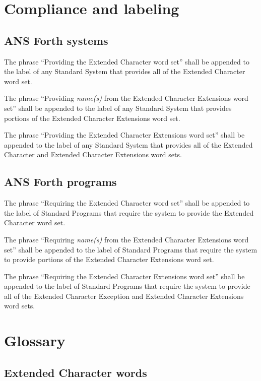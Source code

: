 \section{Compliance and labeling} %

\subsection{ANS Forth systems} %

The phrase ``Providing the Extended Character word set'' shall be
appended to the label of any Standard System that provides all of
the Extended Character word set.

The phrase ``Providing \emph{name(s)} from the Extended Character
Extensions word set'' shall be appended to the label of any Standard
System that provides portions of the Extended Character Extensions
word set.

The phrase ``Providing the Extended Character Extensions word set''
shall be appended to the label of any Standard System that provides
all of the Extended Character and Extended Character Extensions
word sets.

\subsection{ANS Forth programs} %

The phrase ``Requiring the Extended Character word set'' shall be
appended to the label of Standard Programs that require the system
to provide the Extended Character word set.

The phrase ``Requiring \emph{name(s)} from the Extended Character
Extensions word set'' shall be appended to the label of Standard Programs
that require the system to provide portions of the Extended Character
Extensions word set.

The phrase ``Requiring the Extended Character Extensions word set''
shall be appended to the label of Standard Programs that require the
system to provide all of the Extended Character Exception and
Extended Character Extensions word sets.

\section{Glossary} %

\subsection{Extended Character words} %
\cbend

